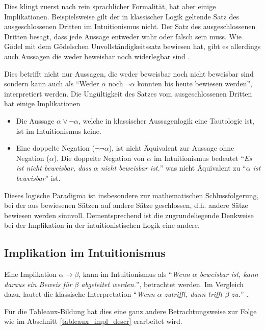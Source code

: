 Dies klingt zuerst nach rein sprachlicher Formalität, hat aber einige Implikationen. Beispielsweise gilt der in klassischer Logik geltende Satz des ausgeschlossenen Dritten im Intuitionismus nicht. Der Satz des ausgeschlossenen Dritten besagt, dass jede Aussage entweder wahr oder falsch sein muss. Wie Gödel mit dem Gödelschen Unvollständigkeitssatz bewiesen hat, gibt es allerdings auch Aussagen die weder beweisbar noch widerlegbar sind \cite{B62}. 

Dies betrifft nicht nur Aussagen, die weder beweisbar noch nicht beweisbar sind sondern kann auch als ``Weder $\alpha$ noch $\neg\alpha$ konnten bis heute bewiesen werden'', interpretiert werden. Die Ungültigkeit des Satzes vom ausgeschlossenen Dritten hat einige Implikationen \cite{B62}
\begin{itemize}
\item Die Aussage $\alpha\vee\neg\alpha$, welche in klassischer Aussagenlogik eine Tautologie ist, ist im Intuitionismus keine.

\item Eine doppelte Negation ($\neg\neg\alpha$), ist nicht Äquivalent zur Aussage ohne Negation ($\alpha$). Die doppelte Negation von $\alpha$ im Intuitionismus bedeutet ``\textit{Es ist nicht beweisbar, dass $\alpha$ nicht beweisbar ist.}'' was nicht Äquivalent zu ``\textit{$\alpha$ ist beweisbar}'' ist.
\end{itemize}

Dieses logische Paradigma ist insbesondere zur mathematischen Schlussfolgerung, bei der aus bewiesenen Sätzen auf andere Sätze geschlossen, d.h. andere Sätze bewiesen werden sinnvoll. Dementsprechend ist die zugrundeliegende Denkweise bei der Implikation in der intuitionistischen Logik eine andere.

\subsection{\label{impl_in_intu}Implikation im Intuitionismus}
Eine Implikation $\alpha\rightarrow\beta$, kann im Intuitionismus als ``\textit{Wenn $\alpha$ beweisbar ist, kann daraus ein Beweis für $\beta$ abgeleitet werden.}'', betrachtet werden. Im Vergleich dazu, lautet die klassische Interpretation ``\textit{Wenn $\alpha$ zutrifft, dann trifft $\beta$ zu.}'' \cite{B62}.

Für die Tableaux-Bildung hat dies eine ganz andere Betrachtungsweise zur Folge wie im Abschnitt \ref{tableaux_impl_descr} erarbeitet wird.


